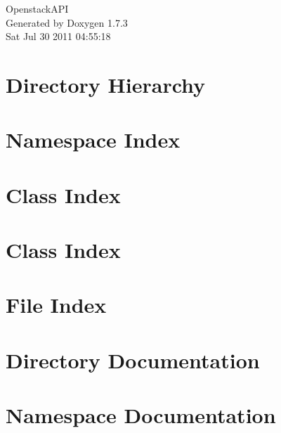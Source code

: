 \documentclass[a4paper]{book}
\begin{document}
\hypersetup{pageanchor=false}
\begin{titlepage}
\vspace*{7cm}
\begin{center}
{\Large OpenstackAPI }\\
\vspace*{1cm}
{\large Generated by Doxygen 1.7.3}\\
\vspace*{0.5cm}
{\small Sat Jul 30 2011 04:55:18}\\
\end{center}
\end{titlepage}
\clearemptydoublepage
{}
\tableofcontents
\clearemptydoublepage
{}
\hypersetup{pageanchor=true}
\chapter{Directory Hierarchy}

\chapter{Namespace Index}

\chapter{Class Index}

\chapter{Class Index}

\chapter{File Index}

\chapter{Directory Documentation}


\chapter{Namespace Documentation}



\end{document}
